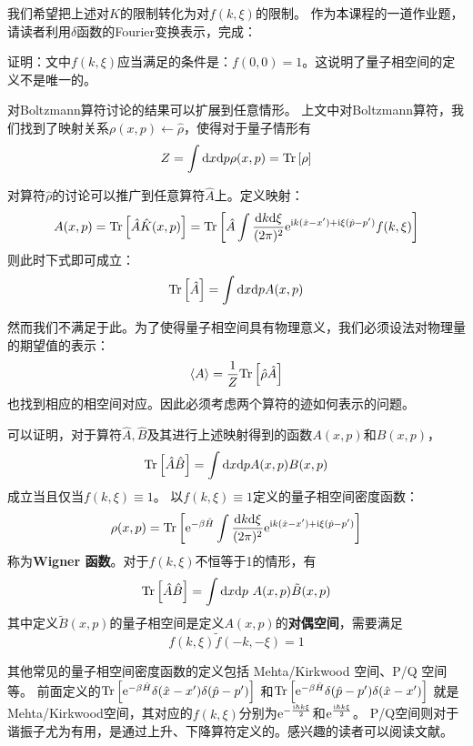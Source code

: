         我们希望把上述对\(K\)的限制转化为对\(f(k, \xi)\)的限制。
        作为本课程的一道作业题，请读者利用\(\delta\)函数的Fourier变换表示，完成：

        \begin{asg}
            证明：文中\(f(k, \xi)\)应当满足的条件是：\(f(0, 0) = 1\)。这说明了量子相空间的定义不是唯一的。
        \end{asg}

        \splitline
        
    对Boltzmann算符讨论的结果可以扩展到任意情形。
    上文中对Boltzmann算符，我们找到了映射关系\(\rho(x, p)\leftarrow \hat{\rho}\)，使得对于量子情形有
    \[
        Z = \int \mathrm{d} x \mathrm{d} p \rho(x, p) = \textrm{Tr}\left[\rho\right]
    \]
    
    对算符\(\hat{\rho}\)的讨论可以推广到任意算符\(\hat{A}\)上。定义映射：
    \[
        A(x, p) = \textrm{Tr}\left[\hat{A} \hat{K}(x, p)\right] = \textrm{Tr}\left[
            \hat{A} \int \frac{\mathrm{d} k \mathrm{d} \xi}{(2\pi)^2}  \mathrm{e}^{\mathrm{i} k(\hat{x} - x') + \mathrm{i} \xi (\hat{p} - p')} f(k, \xi)
            \right]
    \]
    则此时下式即可成立：
    \[
        \textrm{Tr}\left[\hat{A}\right] = \int \mathrm{d} x \mathrm{d} p A(x, p)
    \]

    然而我们不满足于此。为了使得量子相空间具有物理意义，我们必须设法对物理量的期望值的表示：
    \[
        \braket{A} = \frac{1}{Z} \textrm{Tr}\left[\hat{\rho}\hat{A}\right]
    \]
    也找到相应的相空间对应。因此必须考虑两个算符的迹如何表示的问题。
    
    可以证明，对于算符\(\hat{A}, \hat{B}\)及其进行上述映射得到的函数\(A(x, p)\)和\(B(x, p)\)，
    \[\textrm{Tr}\left[\hat{A}\hat{B}\right] = \int \mathrm{d} x \mathrm{d} p A(x, p) B(x, p)\]成立当且仅当\(f(k, \xi) \equiv 1\)。
    以\(f(k, \xi) \equiv 1\)定义的量子相空间密度函数：
    \[
        \rho(x, p) = \textrm{Tr}\left[
            \mathrm{e}^{-\beta\hat{H}} \int \frac{\mathrm{d} k \mathrm{d} \xi}{(2\pi)^2}  \mathrm{e}^{\mathrm{i} k(\hat{x} - x') + \mathrm{i} \xi (\hat{p} - p')}
            \right]
    \]
    称为\textbf{Wigner 函数}。对于\(f(k, \xi)\)不恒等于1的情形，有
    \[
        \textrm{Tr}\left[\hat{A}\hat{B}\right] = \int \mathrm{d} x \mathrm{d} p ~ A(x, p) \tilde{B}(x, p)
    \]
    其中定义\(\tilde{B}(x, p)\)的量子相空间是定义\(A(x, p)\)的\textbf{对偶空间}，需要满足
    \[
        f(k, \xi) \tilde{f}(-k, -\xi) = 1
    \]

    其他常见的量子相空间密度函数的定义包括 Mehta/Kirkwood 空间、P/Q 空间等。
    前面定义的\(\textrm{Tr}\left[\mathrm{e}^{-\beta\hat{H}}\delta(\hat{x} - x')\delta(\hat{p} - p')\right]\)
    和\(\textrm{Tr}\left[\mathrm{e}^{-\beta\hat{H}}\delta(\hat{p} - p')\delta(\hat{x} - x')\right]\)
    就是Mehta/Kirkwood空间，其对应的\(f(k, \xi)\)分别为\(\mathrm{e}^{-\frac{\mathrm{i}\hbar k\xi}{2}}\)和\(\mathrm{e}^{\frac{\mathrm{i}\hbar k\xi}{2}}\)。
    P/Q空间则对于谐振子尤为有用，是通过上升、下降算符定义的。感兴趣的读者可以阅读文献\cite{quantumphasespace}。


